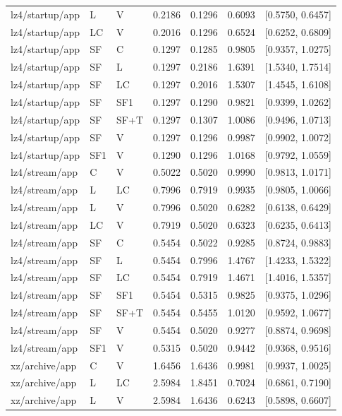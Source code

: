 \begin{longtable}{lllrrrr}
lz4/startup/app & L & V & 0.2186 & 0.1296 & 0.6093 & [0.5750, 0.6457] \\
lz4/startup/app & LC & V & 0.2016 & 0.1296 & 0.6524 & [0.6252, 0.6809] \\
lz4/startup/app & SF & C & 0.1297 & 0.1285 & 0.9805 & [0.9357, 1.0275] \\
lz4/startup/app & SF & L & 0.1297 & 0.2186 & 1.6391 & [1.5340, 1.7514] \\
lz4/startup/app & SF & LC & 0.1297 & 0.2016 & 1.5307 & [1.4545, 1.6108] \\
lz4/startup/app & SF & SF1 & 0.1297 & 0.1290 & 0.9821 & [0.9399, 1.0262] \\
lz4/startup/app & SF & SF+T & 0.1297 & 0.1307 & 1.0086 & [0.9496, 1.0713] \\
lz4/startup/app & SF & V & 0.1297 & 0.1296 & 0.9987 & [0.9902, 1.0072] \\
lz4/startup/app & SF1 & V & 0.1290 & 0.1296 & 1.0168 & [0.9792, 1.0559] \\
lz4/stream/app & C & V & 0.5022 & 0.5020 & 0.9990 & [0.9813, 1.0171] \\
lz4/stream/app & L & LC & 0.7996 & 0.7919 & 0.9935 & [0.9805, 1.0066] \\
lz4/stream/app & L & V & 0.7996 & 0.5020 & 0.6282 & [0.6138, 0.6429] \\
lz4/stream/app & LC & V & 0.7919 & 0.5020 & 0.6323 & [0.6235, 0.6413] \\
lz4/stream/app & SF & C & 0.5454 & 0.5022 & 0.9285 & [0.8724, 0.9883] \\
lz4/stream/app & SF & L & 0.5454 & 0.7996 & 1.4767 & [1.4233, 1.5322] \\
lz4/stream/app & SF & LC & 0.5454 & 0.7919 & 1.4671 & [1.4016, 1.5357] \\
lz4/stream/app & SF & SF1 & 0.5454 & 0.5315 & 0.9825 & [0.9375, 1.0296] \\
lz4/stream/app & SF & SF+T & 0.5454 & 0.5455 & 1.0120 & [0.9592, 1.0677] \\
lz4/stream/app & SF & V & 0.5454 & 0.5020 & 0.9277 & [0.8874, 0.9698] \\
lz4/stream/app & SF1 & V & 0.5315 & 0.5020 & 0.9442 & [0.9368, 0.9516] \\
xz/archive/app & C & V & 1.6456 & 1.6436 & 0.9981 & [0.9937, 1.0025] \\
xz/archive/app & L & LC & 2.5984 & 1.8451 & 0.7024 & [0.6861, 0.7190] \\
xz/archive/app & L & V & 2.5984 & 1.6436 & 0.6243 & [0.5898, 0.6607] \\

\end{longtable}
